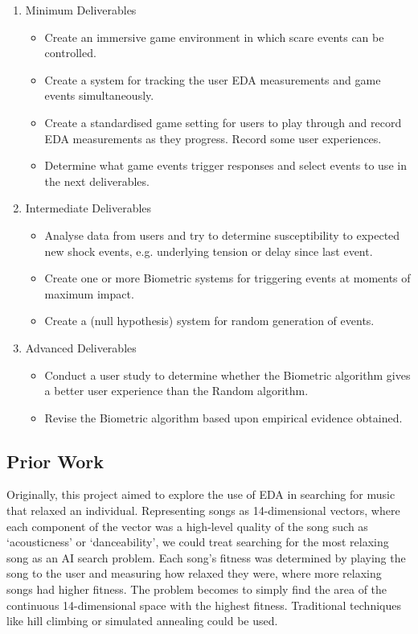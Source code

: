 \documentclass[12pt,a4paper]{article}\usepackage[]{graphicx}\usepackage[]{color}
\begin{document}
\begin{enumerate}
	\item Minimum Deliverables
	\begin{itemize}
		\item Create an immersive game environment in which scare events can be controlled.
		\item Create a system for tracking the user EDA measurements and game events simultaneously.
		\item Create a standardised game setting for users to play through and record EDA measurements as they progress.
		Record some user experiences.
		\item Determine what game events trigger responses and select events to use in the next deliverables.
	\end{itemize}
	
	\item Intermediate Deliverables
	\begin{itemize}
		\item Analyse data from users and try to determine susceptibility to expected new shock events, e.g. underlying tension or delay since last event.
		\item Create one or more Biometric systems for triggering events at moments of maximum impact.
		\item Create a (null hypothesis) system for random generation of events.
	\end{itemize}
	
	\item Advanced Deliverables
	\begin{itemize}
		\item Conduct a user study to determine whether the Biometric algorithm gives a better user experience than the Random algorithm.
		\item Revise the Biometric algorithm based upon empirical evidence obtained.
	\end{itemize}
\end{enumerate}

\subsection{Prior Work}
\label{sec:Prior}

Originally, this project aimed to explore the use of EDA in searching for music that relaxed an individual.
Representing songs as 14-dimensional vectors, where each component of the vector was a high-level quality of the song such as `acousticness' or `danceability', we could treat searching for the most relaxing song as an AI search problem.
Each song's fitness was determined by playing the song to the user and measuring how relaxed they were, where more relaxing songs had higher fitness.
The problem becomes to simply find the area of the continuous 14-dimensional space with the highest fitness.
Traditional techniques like hill climbing or simulated annealing could be used.
\end{document}
